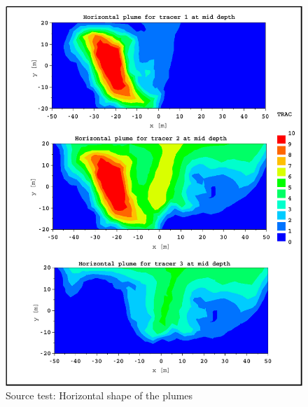 \begin{figure} [H]
\centering
\includegraphics[scale=1.]{../img/source_hor_shape.pdf}
 \caption{Source test: Horizontal shape of the plumes}
 \label{t3d:source:hor_shape}
\end{figure}

